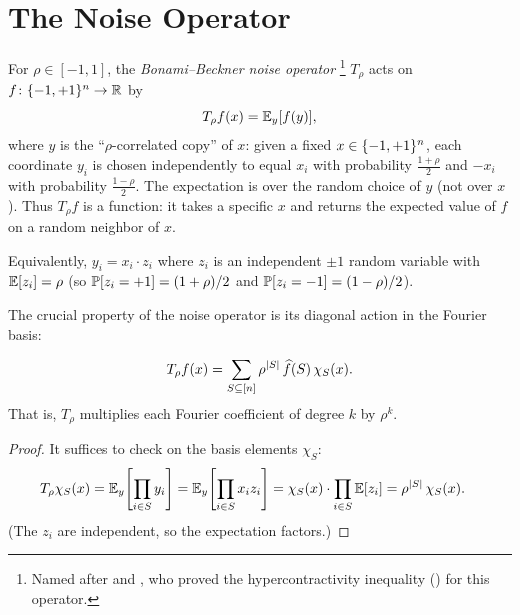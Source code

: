 \section{The Noise Operator}\label{sec:noise-operator}

\begin{definition}\label{def:noise-operator}
For $\rho \in [-1, 1]$, the \emph{Bonami--Beckner noise operator}%
\footnote{Named after \citet{bonami1970etude} and
\citet{beckner1975inequalities}, who proved the hypercontractivity
inequality () for this operator.}
$T_\rho$ acts on $f \colon \{-1,+1\}^n \to \mathbb{R}$ by
\begin{equation}\label{eq:noise-operator}
  T_\rho f(x) = \mathbb{E}_{y}[f(y)],
\end{equation}
where $y$ is the ``$\rho$-correlated copy'' of $x$: given a fixed
$x \in \{-1,+1\}^n$, each coordinate $y_i$ is chosen independently to equal
$x_i$ with probability $\frac{1+\rho}{2}$ and $-x_i$ with probability
$\frac{1-\rho}{2}$. The expectation is over the random choice of $y$
(not over $x$). Thus $T_\rho f$ is a function: it takes a specific
$x$ and returns the expected value of $f$ on a random neighbor of $x$.
\end{definition}

Equivalently, $y_i = x_i \cdot z_i$ where $z_i$ is an independent
$\pm 1$ random variable with $\mathbb{E}[z_i] = \rho$ (so
$\mathbb{P}[z_i = +1] = (1+\rho)/2$ and $\mathbb{P}[z_i = -1] = (1-\rho)/2$).

The crucial property of the noise operator is its diagonal action in the
Fourier basis:

\begin{theorem}\label{thm:noise-spectral}
\begin{equation}\label{eq:noise-spectral}
  T_\rho f(x) = \sum_{S \subseteq [n]} \rho^{|S|}\, \widehat{f}(S)\, \chi_S(x).
\end{equation}
That is, $T_\rho$ multiplies each Fourier coefficient of degree $k$ by
$\rho^k$.
\end{theorem}

\begin{proof}
It suffices to check on the basis elements $\chi_S$:
\begin{align*}
  T_\rho \chi_S(x)
  &= \mathbb{E}_y\!\left[\prod_{i \in S} y_i\right]
  = \mathbb{E}_y\!\left[\prod_{i \in S} x_i z_i\right]
  = \chi_S(x) \cdot \prod_{i \in S} \mathbb{E}[z_i]
  = \rho^{|S|}\, \chi_S(x).
\end{align*}
(The $z_i$ are independent, so the expectation factors.)
\end{proof}

